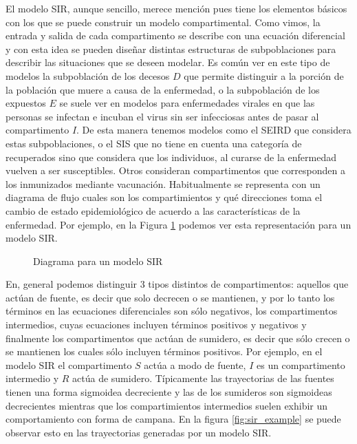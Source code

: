 El modelo SIR, aunque sencillo, merece mención pues tiene los elementos básicos con los que se puede construir un modelo compartimental. Como vimos, la entrada y salida de cada compartimento se describe con una ecuación diferencial y con esta idea se pueden diseñar distintas estructuras de subpoblaciones para describir las situaciones que se deseen modelar. Es común ver en este tipo de modelos la subpoblación de los decesos $D$ que permite distinguir a la porción de la población que muere a causa de la enfermedad, o la subpoblación de los expuestos $E$ se suele ver en modelos para enfermedades virales en que las personas se infectan e incuban el virus sin ser infecciosas antes de pasar al compartimento $I$. De esta manera tenemos modelos como el SEIRD que considera estas subpoblaciones, o el SIS que no tiene en cuenta una categoría de recuperados sino que considera que los individuos, al curarse de la enfermedad vuelven a ser susceptibles. Otros consideran compartimentos que corresponden a los inmunizados mediante vacunación. Habitualmente se representa con un diagrama de flujo cuales son los compartimientos y qué direcciones toma el cambio de estado epidemiológico de acuerdo a las características de la enfermedad. Por ejemplo, en la Figura \ref{dia:sir} podemos ver esta representación para un modelo SIR.
\begin{figure}[h]
    \centering
    \caption{Diagrama para un modelo SIR} \label{dia:sir}
\end{figure}

En, general podemos distinguir 3 tipos distintos de compartimentos: aquellos que actúan de fuente, es decir que solo decrecen o se mantienen, y por lo tanto los términos en las ecuaciones diferenciales son sólo negativos, los compartimentos intermedios, cuyas ecuaciones incluyen términos positivos y negativos y finalmente los compartimentos que actúan de sumidero, es decir que sólo crecen o se mantienen los cuales sólo incluyen términos positivos. Por ejemplo, en el modelo SIR el compartimento $S$ actúa a modo de fuente, $I$ es un compartimento intermedio y $R$ actúa de sumidero. Típicamente las trayectorias de las fuentes tienen una forma sigmoidea decreciente y las de los sumideros son sigmoideas decrecientes mientras que los compartimientos intermedios suelen exhibir un comportamiento con forma de campana. En la figura \ref{fig:sir_example} se puede observar esto en las trayectorias generadas por un modelo SIR.

